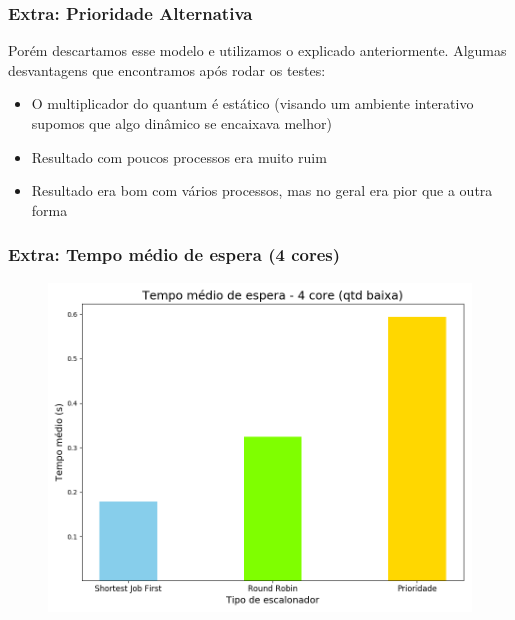 \documentclass{beamer}
\begin{document}
\begin{frame}
\frametitle{Extra: Prioridade Alternativa}
Porém descartamos esse modelo e utilizamos o explicado anteriormente.
Algumas desvantagens que encontramos após rodar os testes:
\begin{itemize}
\item O multiplicador do quantum é estático (visando um ambiente interativo supomos que algo dinâmico se encaixava melhor)
\item Resultado com poucos processos era muito ruim
\item Resultado era bom com vários processos, mas no geral era pior que a outra forma
\end{itemize}
\end{frame}

\begin{frame}
\frametitle{Extra: Tempo médio de espera (4 cores)}
\begin{figure}
\includegraphics[scale=0.4]{avgwt_small_4.png}
\end{figure}
\end{frame}
\end{document}
